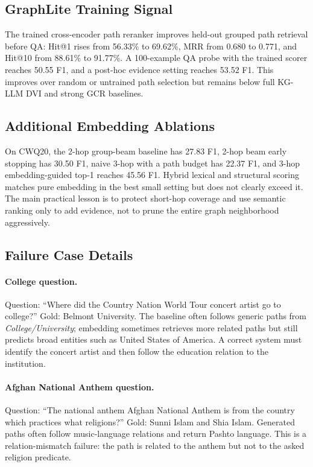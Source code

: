 \documentclass[10pt,twocolumn]{article}
\begin{document}
\subsection{GraphLite Training Signal}
The trained cross-encoder path reranker improves held-out grouped path retrieval before QA: Hit@1 rises from 56.33\% to 69.62\%, MRR from 0.680 to 0.771, and Hit@10 from 88.61\% to 91.77\%. A 100-example QA probe with the trained scorer reaches 50.55 F1, and a post-hoc evidence setting reaches 53.52 F1. This improves over random or untrained path selection but remains below full KG-LLM DVI and strong GCR baselines.

\subsection{Additional Embedding Ablations}
On CWQ20, the 2-hop group-beam baseline has 27.83 F1, 2-hop beam early stopping has 30.50 F1, naive 3-hop with a path budget has 22.37 F1, and 3-hop embedding-guided top-1 reaches 45.56 F1. Hybrid lexical and structural scoring matches pure embedding in the best small setting but does not clearly exceed it. The main practical lesson is to protect short-hop coverage and use semantic ranking only to add evidence, not to prune the entire graph neighborhood aggressively.

\subsection{Failure Case Details}
\paragraph{College question.} Question: ``Where did the Country Nation World Tour concert artist go to college?'' Gold: Belmont University. The baseline often follows generic paths from \emph{College/University}; embedding sometimes retrieves more related paths but still predicts broad entities such as United States of America. A correct system must identify the concert artist and then follow the education relation to the institution.

\paragraph{Afghan National Anthem question.} Question: ``The national anthem Afghan National Anthem is from the country which practices what religions?'' Gold: Sunni Islam and Shia Islam. Generated paths often follow music-language relations and return Pashto language. This is a relation-mismatch failure: the path is related to the anthem but not to the asked religion predicate.
\end{document}
